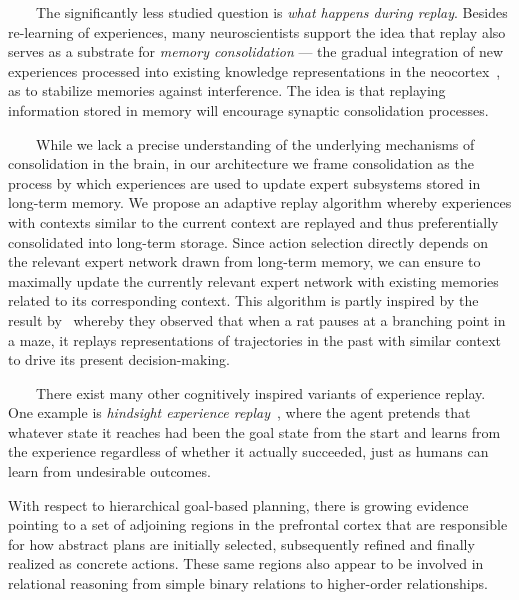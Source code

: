 \documentclass[letterpaper,11pt]{article}
\def\emdash{---}
\begin{document}
\begin{center}
\begin{tcolorbox}[breakable,sharp corners=all,coltitle=black,colbacktitle=white,
    width=\textwidth,boxsep=5pt,left=5pt,right=5pt,
    title={\textbf{Box B: Replaying Experience, Consolidating Memory}}]
~~~~The significantly less studied question is \textit{what happens during replay}. Besides re-learning of experiences, many neuroscientists support the idea that replay also serves as a substrate for \textit{memory consolidation} \emdash{} the gradual integration of new experiences processed into existing knowledge representations in the neocortex~\cite{WilsonandMcNaughtonSCIENCE-94,McClellandetalPR-95,KarlssonandFrankNATURE-NEUROSCIENCE-09,BendorandWilsonNATURE-NEUROSCIENCE-12,KumaranetalTiCS-16}, as to stabilize memories against interference. The idea is that replaying information stored in memory will encourage synaptic consolidation processes. 

~~~~While we lack a precise understanding of the underlying mechanisms of consolidation in the brain, in our architecture we frame consolidation as the process by which experiences are used to update expert subsystems stored in long-term memory. We propose an adaptive replay algorithm whereby experiences with contexts similar to the current context are replayed and thus preferentially consolidated into long-term storage. Since action selection directly depends on the relevant expert network drawn from long-term memory, we can ensure to maximally update the currently relevant expert network with existing memories related to its corresponding context. This algorithm is partly inspired by the result by~\cite{JooandFrankNATURE-REVIEWS-NEUROSCIENCE-18} whereby they observed that when a rat pauses at a branching point in a maze, it replays representations of trajectories in the past with similar context to drive its present decision-making. 

~~~~There exist many other cognitively inspired variants of experience replay. One example is {\textit{hindsight experience replay}}~\cite{AndrychowiczetalCoRR-17}, where the agent pretends that whatever state it reaches had been the goal state from the start and learns from the experience regardless of whether it actually succeeded, just as humans can learn from undesirable outcomes. 

  \end{tcolorbox}
\end{center}


With respect to hierarchical goal-based planning, there is growing evidence pointing to a set of adjoining regions in the prefrontal cortex that are responsible for how abstract plans are initially selected, subsequently refined and finally realized as concrete actions. These same regions also appear to be involved in relational reasoning from simple binary relations to higher-order relationships.
\end{document}
